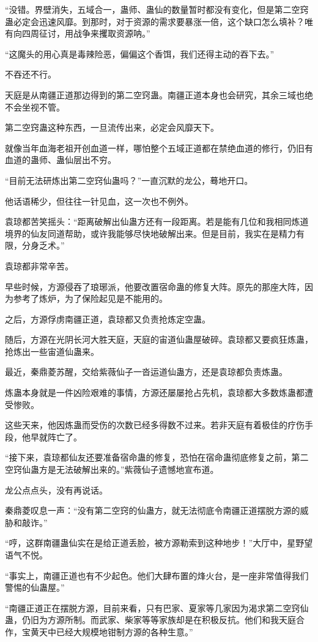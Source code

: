 \begin{this_body}
“没错。界壁消失，五域合一，蛊师、蛊仙的数量暂时都没有变化，但是第二空窍蛊必定会迅速风靡。到那时，对于资源的需求要暴涨一倍，这个缺口怎么填补？唯有向四周征讨，用战争来攫取资源呐。”

“这魔头的用心真是毒辣险恶，偏偏这个香饵，我们还得主动的吞下去。”

不吞还不行。

天庭是从南疆正道那边得到的第二空窍蛊。南疆正道本身也会研究，其余三域也绝不会坐视不管。

第二空窍蛊这种东西，一旦流传出来，必定会风靡天下。

就像当年血海老祖开创血道一样，哪怕整个五域正道都在禁绝血道的修行，仍旧有血道的蛊师、蛊仙层出不穷。

“目前无法研炼出第二空窍仙蛊吗？”一直沉默的龙公，蓦地开口。

他话语稀少，但往往一针见血，这一次也不例外。

袁琼都苦笑摇头：“距离破解出仙蛊方还有一段距离。若是能有几位和我相同炼道境界的仙友同道帮助，或许我能够尽快地破解出来。但是目前，我实在是精力有限，分身乏术。”

袁琼都非常辛苦。

早些时候，方源侵吞了琅琊派，他要改置宿命蛊的修复大阵。原先的那座大阵，因为参考了炼炉，为了保险起见是不能用的。

之后，方源俘虏南疆正道，袁琼都又负责抢炼定空蛊。

随后，方源在光阴长河大胜天庭，天庭的宙道仙蛊屋破碎。袁琼都又要疯狂炼蛊，抢炼出一些宙道仙蛊来。

最近，秦鼎菱苏醒，交给紫薇仙子一沓运道仙蛊方，还是袁琼都负责炼蛊。

炼蛊本身就是一件凶险艰难的事情，方源还屡屡抢占先机，袁琼都大多数炼蛊都遭受惨败。

这些天来，他因炼蛊而受伤的次数已经多得数不过来。若非天庭有着极佳的疗伤手段，他早就阵亡了。

“接下来，袁琼都仙友还要准备宿命蛊的修复，恐怕在宿命蛊彻底修复之前，第二空窍仙蛊方是无法破解出来的。”紫薇仙子遗憾地宣布道。

龙公点点头，没有再说话。

秦鼎菱叹息一声：“没有第二空窍的仙蛊方，就无法彻底令南疆正道摆脱方源的威胁和敲诈。”

“哼，这群南疆蛊仙实在是给正道丢脸，被方源勒索到这种地步！”大厅中，星野望语气不悦。

“事实上，南疆正道也有不少起色。他们大肆布置的烽火台，是一座非常值得我们警惕的仙蛊屋。”

“南疆正道正在摆脱方源，目前来看，只有巴家、夏家等几家因为渴求第二空窍仙蛊，仍旧为方源所制。而武家、柴家等等家族却是在积极反抗。他们和我天庭合作，宝黄天中已经大规模地钳制方源的各种生意。”


\end{this_body}
